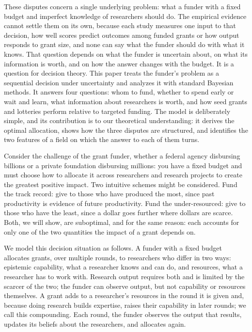 \documentclass[article, 11pt, reqno]{amsart}
\theoremstyle{named}
\begin{document}
These disputes concern a single underlying problem: what a funder with a fixed budget and imperfect knowledge of researchers should do. The empirical evidence cannot settle them on its own, because each study measures one input to that decision, how well scores predict outcomes among funded grants or how output responds to grant size, and none can say what the funder should do with what it knows. That question depends on what the funder is uncertain about, on what its information is worth, and on how the answer changes with the budget. It is a question for decision theory. This paper treats the funder's problem as a sequential decision under uncertainty and analyzes it with standard Bayesian methods. It answers four questions: whom to fund, whether to spend early or wait and learn, what information about researchers is worth, and how seed grants and lotteries perform relative to targeted funding. The model is deliberately simple, and its contribution is to our theoretical understanding: it derives the optimal allocation, shows how the three disputes are structured, and identifies the two features of a field on which the answer to each of them turns.

Consider the challenge of the grant funder, whether a federal agency disbursing billions or a private foundation disbursing millions: you have a fixed budget and must choose how to allocate it across researchers and research projects to create the greatest positive impact. Two intuitive schemes might be considered. Fund the track record: give to those who have produced the most, since past productivity is evidence of future productivity. Fund the under-resourced: give to those who have the least, since a dollar goes further where dollars are scarce. Both, we will show, are suboptimal, and for the same reason: each accounts for only one of the two quantities the impact of a grant depends on.

We model this decision situation as follows. A funder with a fixed budget allocates grants, over multiple rounds, to researchers who differ in two ways: epistemic capability, what a researcher knows and can do, and resources, what a researcher has to work with. Research output requires both and is limited by the scarcer of the two; the funder can observe output, but not capability or resources themselves. A grant adds to a researcher's resources in the round it is given and, because doing research builds expertise, raises their capability in later rounds; we call this compounding. Each round, the funder observes the output that results, updates its beliefs about the researchers, and allocates again.
\end{document}
